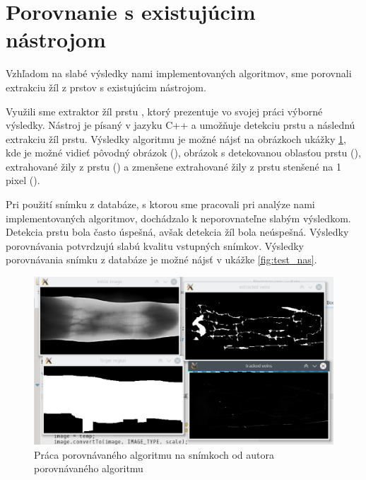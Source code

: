 \documentclass[11pt,a4paper]{article}
\begin{document}
\clearpage
\section{Porovnanie s existujúcim nástrojom} \label{konalio}

Vzhľadom na slabé výsledky nami implementovaných algoritmov, sme porovnali
extrakciu žíl z prstov s existujúcim nástrojom.

Využili sme extraktor žíl prstu \cite{konalio}, ktorý prezentuje vo svojej práci
výborné výsledky. Nástroj je písaný v jazyku C++ a umožňuje detekciu prstu
a následnú extrakciu žíl prstu. Výsledky algoritmu je možné nájsť na obrázkoch
ukážky \ref{fig:test_orig}, kde je možné vidieť pôvodný obrázok
(), obrázok s detekovanou oblasťou prstu
(), extrahované žily z prstu () a zmenšene extrahované žily z prstu stenšené na 1 pixel
().

Pri použití snímku z databáze, s ktorou sme pracovali pri analýze nami
implementovaných algoritmov, dochádzalo k neporovnateľne slabým výsledkom.
Detekcia prstu bola často úspešná, avšak detekcia žíl bola neúspešná.
Výsledky porovnávania potvrdzujú slabú kvalitu vstupných snímkov. Výsledky
porovnávania snímku z databáze je možné nájsť v ukážke \ref{fig:test_nas}.

\begin{landscape}
\begin{figure}[ht!]
	\centering
	\includegraphics[width=27cm]{fig/test_orig.eps}
	\caption{\label{fig:test_orig} Práca porovnávaného algoritmu na snímkoch od autora porovnávaného algoritmu}
\end{figure}
\end{landscape}
\end{document}
